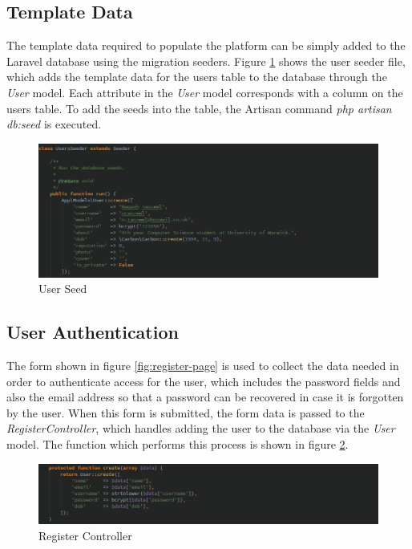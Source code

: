 \subsection{Template Data}
The template data required to populate the platform can be simply added to the Laravel database using the migration seeders. Figure \ref{fig:seed} shows the user seeder file, which adds the template data for the users table to the database through the \emph{User} model. Each attribute in the \emph{User} model corresponds with a column on the users table. To add the seeds into the table, the Artisan command \textit{php artisan db:seed} is executed.

\begin{figure}[H]
    \centering
    \includegraphics[width=\textwidth]{Images/Implementation/seed}
    \caption{User Seed} \label{fig:seed}
\end{figure}

\subsection{User Authentication}
The form shown in figure \ref{fig:register-page} is used to collect the data needed in order to authenticate access for the user, which includes the password fields and also the email address so that a password can be recovered in case it is forgotten by the user. When this form is submitted, the form data is passed to the \emph{RegisterController}, which handles adding the user to the database via the \emph{User} model. The function which performs this process is shown in figure \ref{fig:register-controller}.

\begin{figure}[H]
    \centering
    \includegraphics[width=\textwidth]{Images/Implementation/register-controller}
    \caption{Register Controller} \label{fig:register-controller}
\end{figure}